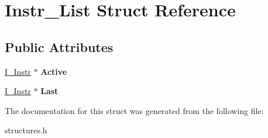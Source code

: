 \hypertarget{structInstr__List}{}\section{Instr\+\_\+\+List Struct Reference}
\label{structInstr__List}
\subsection*{Public Attributes}
\begin{DoxyCompactItemize}
\item 
\hypertarget{structInstr__List_a109cd3d8dae66153ee9e91a415cda762}{}\hyperlink{structI__Instr}{I\+\_\+\+Instr} $\ast$ {\bfseries Active}\label{structInstr__List_a109cd3d8dae66153ee9e91a415cda762}

\item 
\hypertarget{structInstr__List_a886c68322614174f896fb9c9349ef33a}{}\hyperlink{structI__Instr}{I\+\_\+\+Instr} $\ast$ {\bfseries Last}\label{structInstr__List_a886c68322614174f896fb9c9349ef33a}

\end{DoxyCompactItemize}


The documentation for this struct was generated from the following file\+:\begin{DoxyCompactItemize}
\item 
structures.\+h\end{DoxyCompactItemize}
